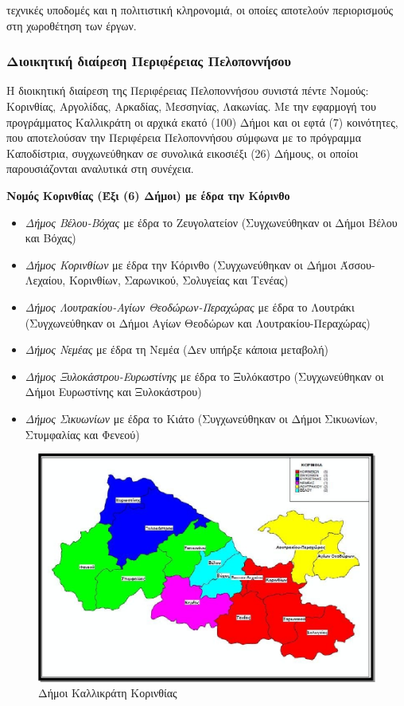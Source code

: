 \documentclass[12pt]{article}
\begin{document}
τεχνικές υποδομές και η πολιτιστική κληρονομιά, οι οποίες αποτελούν περιορισμούς στη χωροθέτηση των έργων.
	
	\subsubsection{Διοικητική διαίρεση Περιφέρειας Πελοποννήσου}
	
	Η διοικητική διαίρεση της Περιφέρειας Πελοποννήσου συνιστά πέντε Νομούς: Κορινθίας, Αργολίδας, Αρκαδίας, Μεσσηνίας, Λακωνίας. Με την εφαρμογή του προγράμματος Καλλικράτη οι αρχικά εκατό (100) Δήμοι και οι εφτά (7) κοινότητες, που αποτελούσαν την Περιφέρεια Πελοποννήσου σύμφωνα με το πρόγραμμα Καποδίστρια, συγχωνεύθηκαν σε συνολικά εικοσιέξι (26) Δήμους, οι οποίοι παρουσιάζονται αναλυτικά στη συνέχεια.
	
	\textbf{Νομός Κορινθίας (Έξι (6) Δήμοι)  με έδρα την Κόρινθο}
	\begin{itemize}
		\item \emph{Δήμος Βέλου-Βόχας} με έδρα το Ζευγολατείον (Συγχωνεύθηκαν οι Δήμοι Βέλου και  Βόχας)
		\item \emph{Δήμος Κορινθίων} με έδρα την Κόρινθο (Συγχωνεύθηκαν οι Δήμοι Άσσου-Λεχαίου, Κορινθίων, Σαρωνικού, Σολυγείας και Τενέας)
		\item \emph{Δήμος Λουτρακίου-Αγίων Θεοδώρων-Περαχώρας} με έδρα το Λουτράκι (Συγχωνεύθηκαν οι Δήμοι Αγίων Θεοδώρων και Λουτρακίου-Περαχώρας)
		\item \emph{Δήμος Νεμέας} με έδρα τη Νεμέα (Δεν υπήρξε κάποια μεταβολή) 
		\item \emph{Δήμος Ξυλοκάστρου-Ευρωστίνης} με έδρα το Ξυλόκαστρο (Συγχωνεύθηκαν οι Δήμοι Ευρωστίνης και Ξυλοκάστρου)
		\item \emph{Δήμος Σικυωνίων} με έδρα το Κιάτο (Συγχωνεύθηκαν οι Δήμοι Σικυωνίων, Στυμφαλίας και Φενεού) 
	\end{itemize}
	
	\begin{figure} [H]
		\begin{center}
			\includegraphics [scale = 0.55] {korinthia.png}
			\caption{Δήμοι Καλλικράτη Κορινθίας}
		\end{center}
	\end{figure}
	
\end{document}
